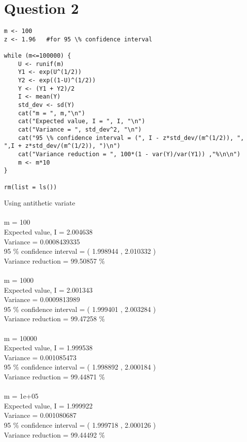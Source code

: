 \documentclass{article}
\begin{document}
\section{Question 2}


\begin{lstlisting}
m <- 100
z <- 1.96	#for 95 \% confidence interval

while (m<=100000) {
	U <- runif(m)
	Y1 <- exp(U^(1/2))
	Y2 <- exp((1-U)^(1/2))
	Y <- (Y1 + Y2)/2
	I <- mean(Y)
	std_dev <- sd(Y)
	cat("m = ", m,"\n")
	cat("Expected value, I = ", I, "\n")
	cat("Variance = ", std_dev^2, "\n")
	cat("95 \% confidence interval = (", I - z*std_dev/(m^(1/2)), ", ",I + z*std_dev/(m^(1/2)), ")\n")
	cat("Variance reduction = ", 100*(1 - var(Y)/var(Y1)) ,"%\n\n")
	m <- m*10
}

rm(list = ls())
\end{lstlisting}
Using antithetic variate\\\\
m =  100 \\
Expected value, I =  2.004638 \\
Variance =  0.0008439335 \\
95 \% confidence interval = ( 1.998944 ,  2.010332 )\\
Variance reduction =  99.50857 \% \\\\
m =  1000 \\
Expected value, I =  2.001343 \\
Variance =  0.0009813989 \\
95 \% confidence interval = ( 1.999401 ,  2.003284 )\\
Variance reduction =  99.47258 \% \\\\
m =  10000 \\
Expected value, I =  1.999538 \\
Variance =  0.001085473 \\
95 \% confidence interval = ( 1.998892 ,  2.000184 )\\
Variance reduction =  99.44871 \% \\\\
m =  1e+05 \\
Expected value, I =  1.999922 \\
Variance =  0.001080687 \\
95 \% confidence interval = ( 1.999718 ,  2.000126 ) \\
Variance reduction =  99.44492 \% \\\\
\end{document}
